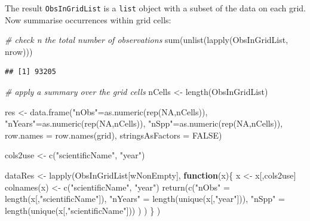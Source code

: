 \documentclass[
  10pt,
]{article}
\newenvironment{Shaded}{\begin{snugshade}}{\end{snugshade}}
\newcommand{\AttributeTok}[1]{\textcolor[rgb]{0.77,0.63,0.00}{#1}}
\newcommand{\CommentTok}[1]{\textcolor[rgb]{0.56,0.35,0.01}{\textit{#1}}}
\newcommand{\ConstantTok}[1]{\textcolor[rgb]{0.00,0.00,0.00}{#1}}
\newcommand{\ControlFlowTok}[1]{\textcolor[rgb]{0.13,0.29,0.53}{\textbf{#1}}}
\newcommand{\FunctionTok}[1]{\textcolor[rgb]{0.00,0.00,0.00}{#1}}
\newcommand{\NormalTok}[1]{#1}
\newcommand{\OtherTok}[1]{\textcolor[rgb]{0.56,0.35,0.01}{#1}}
\newcommand{\StringTok}[1]{\textcolor[rgb]{0.31,0.60,0.02}{#1}}
\begin{document}
The result \texttt{ObsInGridList} is a \texttt{list} object with a subset of the data on each grid. Now summarise occurrences within grid cells:

\begin{Shaded}
\begin{Highlighting}[]
\CommentTok{\# check n the total number of observations}
\FunctionTok{sum}\NormalTok{(}\FunctionTok{unlist}\NormalTok{(}\FunctionTok{lapply}\NormalTok{(ObsInGridList, nrow)))}
\end{Highlighting}
\end{Shaded}

\begin{verbatim}
## [1] 93205
\end{verbatim}

\begin{Shaded}
\begin{Highlighting}[]
\CommentTok{\# apply a summary over the grid cells }
\NormalTok{nCells }\OtherTok{\textless{}{-}} \FunctionTok{length}\NormalTok{(ObsInGridList)}

\NormalTok{res }\OtherTok{\textless{}{-}} \FunctionTok{data.frame}\NormalTok{(}\StringTok{"nObs"}\OtherTok{=}\FunctionTok{as.numeric}\NormalTok{(}\FunctionTok{rep}\NormalTok{(}\ConstantTok{NA}\NormalTok{,nCells)),}
                  \StringTok{"nYears"}\OtherTok{=}\FunctionTok{as.numeric}\NormalTok{(}\FunctionTok{rep}\NormalTok{(}\ConstantTok{NA}\NormalTok{,nCells)),}
                  \StringTok{"nSpp"}\OtherTok{=}\FunctionTok{as.numeric}\NormalTok{(}\FunctionTok{rep}\NormalTok{(}\ConstantTok{NA}\NormalTok{,nCells)),}
                  \AttributeTok{row.names =} \FunctionTok{row.names}\NormalTok{(grid),}
                  \AttributeTok{stringsAsFactors =} \ConstantTok{FALSE}\NormalTok{)}

\NormalTok{cols2use }\OtherTok{\textless{}{-}} \FunctionTok{c}\NormalTok{(}\StringTok{"scientificName"}\NormalTok{, }\StringTok{"year"}\NormalTok{)}

\NormalTok{dataRes }\OtherTok{\textless{}{-}} \FunctionTok{lapply}\NormalTok{(ObsInGridList[wNonEmpty], }
                  \ControlFlowTok{function}\NormalTok{(x)\{}
\NormalTok{                    x }\OtherTok{\textless{}{-}}\NormalTok{ x[,cols2use]}
                    \FunctionTok{colnames}\NormalTok{(x) }\OtherTok{\textless{}{-}} \FunctionTok{c}\NormalTok{(}\StringTok{"scientificName"}\NormalTok{, }\StringTok{"year"}\NormalTok{)}
                    \FunctionTok{return}\NormalTok{(}\FunctionTok{c}\NormalTok{(}\StringTok{"nObs"} \OtherTok{=} \FunctionTok{length}\NormalTok{(x[,}\StringTok{"scientificName"}\NormalTok{]),}
                             \StringTok{"nYears"} \OtherTok{=} \FunctionTok{length}\NormalTok{(}\FunctionTok{unique}\NormalTok{(x[,}\StringTok{"year"}\NormalTok{])),}
                             \StringTok{"nSpp"} \OtherTok{=} \FunctionTok{length}\NormalTok{(}\FunctionTok{unique}\NormalTok{(x[,}\StringTok{"scientificName"}\NormalTok{]))}
\NormalTok{                             )}
\NormalTok{                           )}
\NormalTok{                    \}}
\NormalTok{                  )}


\end{Highlighting}
\end{Shaded}
\end{document}
